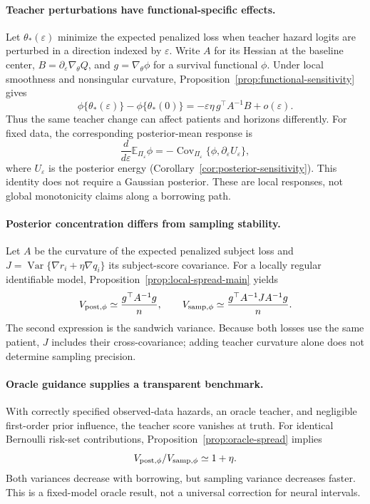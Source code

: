 \documentclass{article} %
\begin{document}
\paragraph{Teacher perturbations have functional-specific effects.}
Let $\theta_*(\varepsilon)$ minimize the expected penalized loss when teacher hazard logits are perturbed in a direction indexed by $\varepsilon$. Write $A$ for its Hessian at the baseline center, $B=\partial_\varepsilon\nabla_\theta Q$, and $g=\nabla_\theta\phi$ for a survival functional $\phi$. Under local smoothness and nonsingular curvature, Proposition~\ref{prop:functional-sensitivity} gives
\[
\phi\{\theta_*(\varepsilon)\}-\phi\{\theta_*(0)\}
=-\varepsilon\eta\,g^\top A^{-1}B+o(\varepsilon).
\]
Thus the same teacher change can affect patients and horizons differently. For fixed data, the corresponding posterior-mean response is
\[
\frac{d}{d\varepsilon}\mathbb E_{\Pi_\varepsilon}\phi
=-\operatorname{Cov}_{\Pi_\varepsilon}
  \{\phi,\partial_\varepsilon U_\varepsilon\},
\]
where $U_\varepsilon$ is the posterior energy (Corollary~\ref{cor:posterior-sensitivity}). This identity does not require a Gaussian posterior. These are local responses, not global monotonicity claims along a borrowing path.

\paragraph{Posterior concentration differs from sampling stability.}
Let $A$ be the curvature of the expected penalized subject loss and
$J=\operatorname{Var}\{\nabla r_i+\eta\nabla q_i\}$ its subject-score covariance.
For a locally regular identifiable model, Proposition~\ref{prop:local-spread-main} yields
\[
V_{{\rm post},\phi}\simeq\frac{g^\top A^{-1}g}{n},
\qquad
V_{{\rm samp},\phi}\simeq\frac{g^\top A^{-1}JA^{-1}g}{n}.
\]
The second expression is the sandwich variance. Because both losses use the same patient, $J$ includes their cross-covariance; adding teacher curvature alone does not determine sampling precision.

\paragraph{Oracle guidance supplies a transparent benchmark.}
With correctly specified observed-data hazards, an oracle teacher, and negligible first-order prior influence, the teacher score vanishes at truth. For identical Bernoulli risk-set contributions, Proposition~\ref{prop:oracle-spread} implies
\[
V_{{\rm post},\phi}/V_{{\rm samp},\phi}\simeq1+\eta.
\]
Both variances decrease with borrowing, but sampling variance decreases faster. This is a fixed-model oracle result, not a universal correction for neural intervals.
\end{document}
